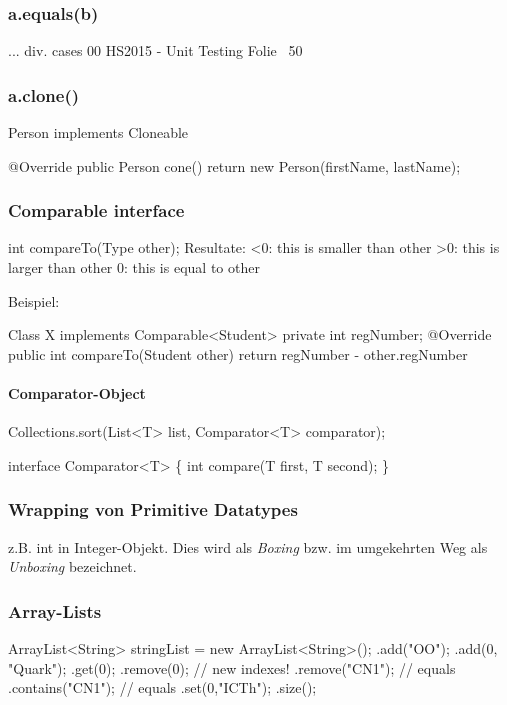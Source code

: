 \begin{multicols}{2}
\subsubsection{a.equals(b)}
... div. cases 00 HS2015 - Unit Testing Folie ~50

\subsubsection{a.clone()}

	Person implements Cloneable {

		@Override
		public Person cone() {
			return new Person(firstName, lastName);
		}
	}

\subsubsection{Comparable interface}

	int compareTo(Type other);
	Resultate: 
	<0: this is smaller than other
	>0: this is larger than other
	0: this is equal to other


	Beispiel:

	Class X implements Comparable<Student> {
		private int regNumber;
		@Override
		public int compareTo(Student other) {
			return regNumber - other.regNumber
		}
	}
	
	\paragraph{Comparator-Object}
	
	Collections.sort(List<T> list, Comparator<T> comparator);
	
	interface Comparator<T> \{
		int compare(T first, T second);
	\}
	
\subsubsection{Wrapping von Primitive Datatypes}
	z.B. int in Integer-Objekt. Dies wird als \emph{Boxing} bzw. im umgekehrten Weg als \emph{Unboxing} bezeichnet.
\end{multicols}

\subsubsection{Array-Lists}

	ArrayList<String> stringList = new ArrayList<String>();
	.add("OO");
	.add(0, "Quark");
	.get(0);
	.remove(0); // new indexes!
	.remove("CN1"); // equals
	.contains("CN1"); // equals
	.set(0,"ICTh");
	.size();

